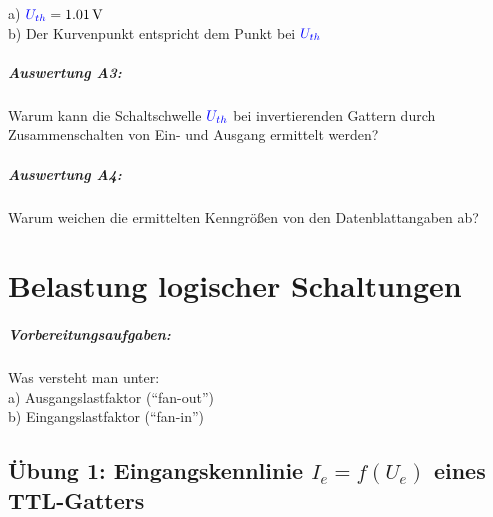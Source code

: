 \documentclass[11pt,a4paper,titlepage,parskip=half]{scrreprt}
\begin{document}
        a) $\textcolor{blue}{U_{th}} = \SI{1,01}{\volt}$\\
        b) Der Kurvenpunkt entspricht dem Punkt bei $\textcolor{blue}{U_{th}}$

        \paragraph{Auswertung A3:}\label{sec:auswertung-a3} Warum kann die Schaltschwelle $\textcolor{blue}{U_{th}}$ bei invertierenden Gattern durch Zusammenschalten von Ein- und Ausgang ermittelt werden?

        \paragraph{Auswertung A4:} Warum weichen die ermittelten Kenngrößen von den Datenblattangaben ab?

    \chapter{Belastung logischer Schaltungen}
      \paragraph{Vorbereitungsaufgaben:} Was versteht man unter:\\
        a) Ausgangslastfaktor ("`fan-out"')\\
        b) Eingangslastfaktor ("`fan-in"')

        
    \section{Übung 1: Eingangskennlinie $I_e = f(U_e)$ eines TTL-Gatters}
\end{document}
